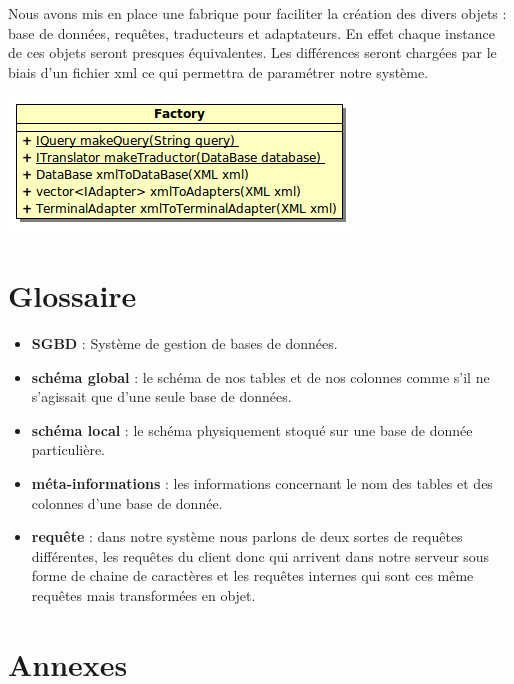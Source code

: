 \documentclass[12pt]{article}
\begin{document}
Nous avons mis en place une fabrique pour faciliter la création des divers objets : base de données, requêtes, traducteurs et adaptateurs. En effet chaque instance de ces objets seront presques équivalentes. Les différences seront chargées par le biais d'un fichier xml ce qui permettra de paramétrer notre système.

\begin{center}
	\includegraphics[scale=0.75]{images/Factory.png}
\end{center}

\newpage

\section{Glossaire}

	\begin{itemize}
		\item \textbf{SGBD} : Système de gestion de bases de données.\\
		\item \textbf{schéma global} : le schéma de nos tables et de nos colonnes comme s'il ne s'agissait que d'une seule base de données.\\
		\item \textbf{schéma local} : le schéma physiquement stoqué sur une base de donnée particulière.\\
		\item \textbf{méta-informations} : les informations concernant le nom des tables et des colonnes d'une base de donnée.\\
		\item \textbf{requête} : dans notre système nous parlons de deux sortes de requêtes différentes, les requêtes du client donc qui arrivent dans notre serveur sous forme de chaine de caractères et les requêtes internes qui sont ces même requêtes mais transformées en objet.\\
	\end{itemize}
\newpage
\section{Annexes}
\end{document}
